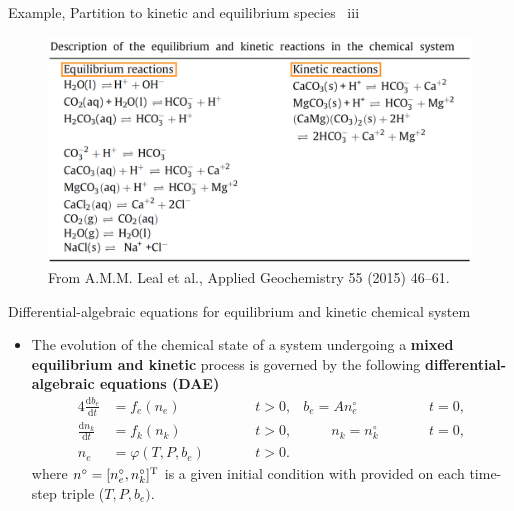 %
\begin{frame}{Example, Partition to kinetic and equilibrium species \, iii}
	\begin{figure}
		\centering
		\includegraphics[height=0.85\textheight]{figures/chemical-kinetics/partitioning-example-3.png}
		\caption*{From A.M.M. Leal et al., Applied Geochemistry 55 (2015) 46--61.}
	\end{figure}
\end{frame}
%
%
\begin{frame}{Differential-algebraic equations for equilibrium and kinetic chemical system}
	\begin{itemize}
	\item The evolution of the chemical state of a system undergoing a
	{\bf mixed equilibrium and kinetic} process is governed by the following
	\alert{\bf differential-algebraic equations (DAE)}
	\begin{alignat*}{4}
		\frac{\mathrm{d}b_{e}}{\mathrm{d}t} & = f_e(n_e)& \qquad & t>0, & b_{e}=An_{e}^{\circ} & \qquad & t=0,\label{eq:full-kinetics}\\
		\frac{\mathrm{d}n_{k}}{\mathrm{d}t} & = f_k(n_k) &  & t>0, & \qquad n_{k}=n_{k}^{\circ} &  & t=0,\nonumber \\
		n_{e} & =\varphi(T,P,b_{e}) &  & t>0. & &  & 
		\nonumber 
	\end{alignat*}
	where $n^{\circ}=[n_{e}^{\circ},n_{k}^{\circ}]^{{\rm T}}$ is a given
	initial condition with provided on each time-step triple ($T,P,b_e)$.
	\end{itemize}
\end{frame}
